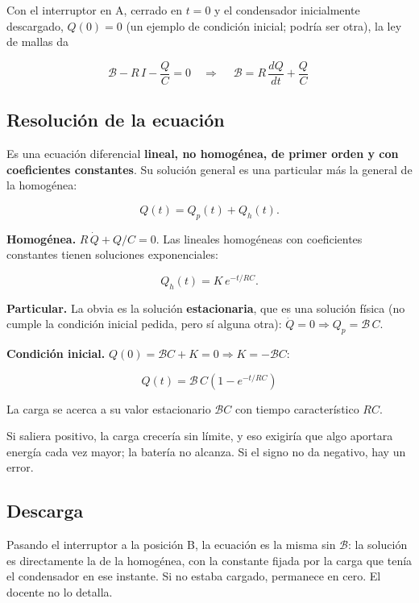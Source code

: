 \documentclass[12pt,a4paper]{article}
\begin{document}
Con el interruptor en A, cerrado en $t=0$ y el condensador inicialmente
descargado, $Q(0)=0$ (un ejemplo de condición inicial; podría ser otra), la ley
de mallas da

\[
\mathcal{B} - R\,I - \frac{Q}{C} = 0
\quad\Longrightarrow\quad
\boxed{\ \mathcal{B} = R\,\frac{dQ}{dt} + \frac{Q}{C}\ }
\]

\subsection{Resolución de la ecuación}

Es una ecuación diferencial \textbf{lineal, no homogénea, de primer orden y con
coeficientes constantes}. Su solución general es una particular más la general
de la homogénea:

\[
Q(t) = Q_p(t) + Q_h(t).
\]

\textbf{Homogénea.} $R\,\dot Q + Q/C = 0$. Las lineales homogéneas con coeficientes
constantes tienen soluciones exponenciales:

\[
Q_h(t) = K\,e^{-t/RC}.
\]

\textbf{Particular.} La obvia es la solución \textbf{estacionaria}, que es una solución
física (no cumple la condición inicial pedida, pero sí alguna otra):
$\dot Q = 0 \Rightarrow Q_p = \mathcal{B}\,C$.

\textbf{Condición inicial.} $Q(0) = \mathcal{B}C + K = 0 \Rightarrow K = -\mathcal{B}C$:

\begin{keybox}
\[
\boxed{\ Q(t) = \mathcal{B}\,C\left(1 - e^{-t/RC}\right)\ }
\]
\end{keybox}

La carga se acerca a su valor estacionario $\mathcal{B}C$ con tiempo
característico $RC$.

\begin{warnbox}
Si saliera positivo, la carga
crecería sin límite, y eso exigiría que algo aportara energía cada vez mayor;
la batería no alcanza. Si el signo no da negativo, hay un error.
\end{warnbox}

\subsection{Descarga}

Pasando el interruptor a la posición B, la ecuación es la misma sin
$\mathcal{B}$: la solución es directamente la de la homogénea, con la constante
fijada por la carga que tenía el condensador en ese instante. Si no estaba
cargado, permanece en cero. El docente no lo detalla.
\end{document}
